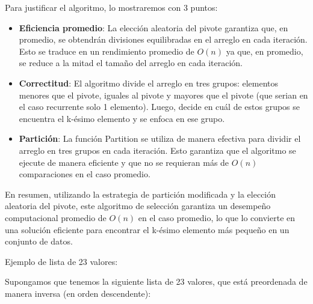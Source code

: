 \documentclass[answers, 11pt]{exam}
\begin{document}
\begin{questions}
\begin{solution}
    Para justificar el algoritmo, lo mostraremos con 3 puntos:
    \begin{itemize}
      \item \textbf{Eficiencia promedio}: La elección aleatoria del pivote garantiza que, 
      en promedio, se obtendrán divisiones equilibradas en el arreglo en cada 
      iteración. Esto se traduce en un rendimiento promedio de $O(n)$ ya que, en 
      promedio, se reduce a la mitad el tamaño del arreglo en cada iteración.

      \item \textbf{Correctitud}: El algoritmo divide el arreglo en tres grupos: elementos 
      menores que el pivote, iguales al pivote y mayores que el pivote (que serian en el caso 
      recurrente solo 1 elemento). Luego, decide en cuál de estos grupos se encuentra 
      el k-ésimo elemento y se enfoca en ese grupo.
      
      \item \textbf{Partición}: La función Partition se utiliza de manera efectiva para 
      dividir el arreglo en tres grupos en cada iteración. Esto garantiza que el 
      algoritmo se ejecute de manera eficiente y que no se requieran más de $O(n)$ 
      comparaciones en el caso promedio.
    \end{itemize}

    En resumen, utilizando la estrategia de partición modificada y la elección aleatoria del 
    pivote, este algoritmo de selección garantiza un desempeño computacional 
    promedio de $O(n)$ en el caso promedio, lo que lo convierte en una solución 
    eficiente para encontrar el k-ésimo elemento más pequeño en un conjunto de datos.

\end{solution}


\begin{solution}
  Ejemplo de lista de 23 valores:

Supongamos que tenemos la siguiente lista de 23 valores, que está preordenada de manera inversa (en orden descendente):


\end{solution}
\end{questions}
\end{document}
